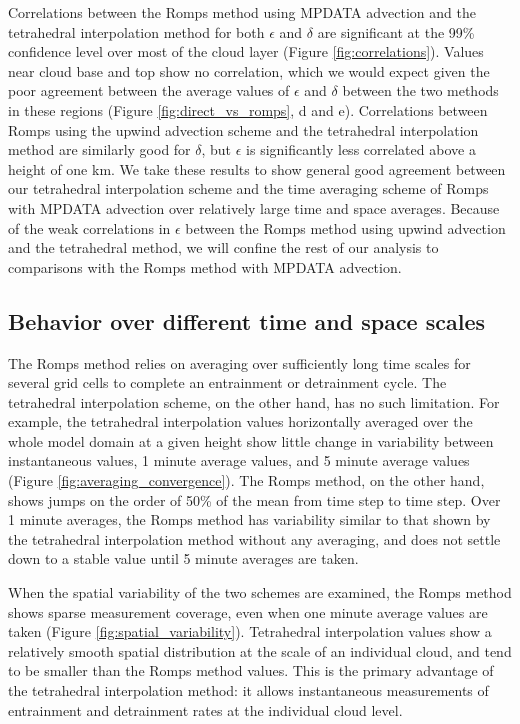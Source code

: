 \documentclass[12pt]{article}
\begin{document}
Correlations between the Romps method using MPDATA advection and the 
tetrahedral interpolation method for both $\epsilon$ and $\delta$ are 
significant at the 99\% confidence level over most of the cloud layer (Figure 
\ref{fig:correlations}).  Values near cloud base and top show no correlation, 
which we would expect given the poor agreement between the average values of 
$\epsilon$ and $\delta$ between the two methods in these regions (Figure 
\ref{fig:direct_vs_romps}, d and e).  Correlations between Romps using the 
upwind advection scheme and the tetrahedral interpolation method are similarly
good for $\delta$, but $\epsilon$ is significantly less correlated above a 
height of one km.  We take these results to show general good agreement between 
our tetrahedral interpolation scheme and the time averaging scheme of Romps 
with MPDATA advection over relatively large time and space averages.  Because 
of the weak correlations in $\epsilon$ between the Romps method using upwind 
advection and the tetrahedral method, we will confine the rest of our analysis 
to comparisons with the Romps method with MPDATA advection.

\subsection{Behavior over different time and space scales}

The Romps method relies on averaging over sufficiently long time scales for 
several grid cells to complete an entrainment or detrainment cycle.  The 
tetrahedral interpolation scheme, on the other hand, has no such limitation.  
For example, the tetrahedral interpolation values horizontally averaged over 
the whole model domain at a given height show little change in variability 
between instantaneous values, 1 minute average values, and 5 minute average 
values (Figure \ref{fig:averaging_convergence}).  The Romps method, on the 
other hand, shows jumps on the order of 50\% of the mean from time step to 
time step.  Over 1 minute averages, the Romps method has variability 
similar to that shown by the tetrahedral interpolation method without any 
averaging, and does not settle down to a stable value until 5 minute averages 
are taken.

When the spatial variability of the two schemes are examined, the Romps 
method shows sparse measurement coverage, even when one minute average values 
are taken (Figure \ref{fig:spatial_variability}).  Tetrahedral interpolation 
values show a relatively smooth spatial distribution at the scale of an 
individual cloud, and tend to be smaller than the Romps method values.  
This is the primary advantage of the tetrahedral interpolation method: it 
allows instantaneous measurements of entrainment and detrainment rates at the 
individual cloud level.
\end{document}
